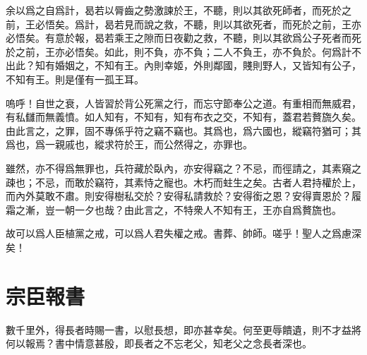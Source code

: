 余以爲之自爲計，曷若以脣齒之勢激諫於王，不聽，則以其欲死師者，而死於之前，王必悟矣。爲計，曷若見而說之救，不聽，則以其欲死者，而死於之前，王亦必悟矣。有意於報，曷若乘王之隙而日夜勸之救，不聽，則以其欲爲公子死者而死於之前，王亦必悟矣。如此，則不負，亦不負；二人不負王，亦不負於。何爲計不出此？知有婚姻之，不知有王。內則幸姬，外則鄰國，賤則野人，又皆知有公子，不知有王。則是僅有一孤王耳。

嗚呼！自世之衰，人皆習於背公死黨之行，而忘守節奉公之道。有重相而無威君，有私讎而無義憤。如人知有，不知有，知有布衣之交，不知有，蓋君若贅旒久矣。由此言之，之罪，固不專係乎符之竊不竊也。其爲也，爲六國也，縱竊符猶可；其爲也，爲一親戚也，縱求符於王，而公然得之，亦罪也。

雖然，亦不得爲無罪也，兵符藏於臥內，亦安得竊之？不忌，而徑請之，其素窺之疎也；不忌，而敢於竊符，其素恃之寵也。木朽而蛀生之矣。古者人君持權於上，而內外莫敢不肅。則安得樹私交於？安得私請救於？安得銜之恩？安得賣恩於？履霜之漸，豈一朝一夕也哉？由此言之，不特衆人不知有王，王亦自爲贅旒也。

故可以爲人臣植黨之戒，可以爲人君失權之戒。書葬、帥師。嗟乎！聖人之爲慮深矣！


\section[報劉一丈書\quad{\small 宗臣}]{{\normalsize 宗臣}\quad 報書} 
數千里外，得長者時賜一書，以慰長想，即亦甚幸矣。何至更辱饋遺，則不才益將何以報焉？書中情意甚殷，即長者之不忘老父，知老父之念長者深也。

